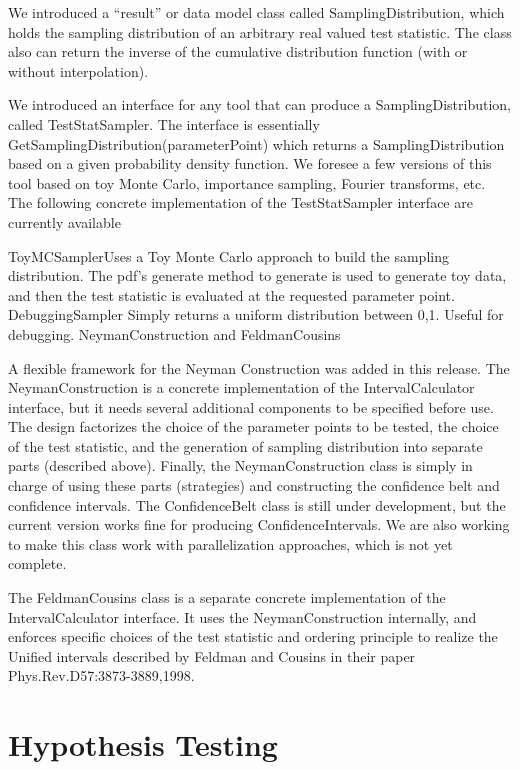 \documentclass[11pt]{article}
\begin{document}
We introduced a ``result'' or data model class called SamplingDistribution, which holds the sampling distribution of an arbitrary real valued test statistic.  The class also can return the inverse of the cumulative distribution function (with or without interpolation).  

We introduced an interface for any tool that can produce a SamplingDistribution, called TestStatSampler.  The interface is essentially GetSamplingDistribution(parameterPoint) which returns a SamplingDistribution based on a given probability density function.  We foresee a few versions of this tool based on toy Monte Carlo, importance sampling, Fourier transforms, etc.  The following concrete implementation of the TestStatSampler interface are currently available

ToyMCSamplerUses a Toy Monte Carlo approach to build the sampling distribution.  The pdf's generate method to generate is used to generate toy data, and then the test statistic is evaluated at the requested parameter point.
DebuggingSampler Simply returns a uniform distribution between 0,1.  Useful for debugging.
NeymanConstruction and FeldmanCousins

A flexible framework for the Neyman Construction was added in this release. The NeymanConstruction is a concrete implementation of the IntervalCalculator interface, but it needs several additional components to be specified before use. The design factorizes the choice of the parameter points to be tested, the choice of the test statistic, and the generation of sampling distribution into separate parts (described above).  Finally, the NeymanConstruction class is simply in charge of using these parts (strategies) and constructing the confidence belt and confidence intervals.  The ConfidenceBelt class is still under development, but the current version works fine for producing ConfidenceIntervals.  We are also working to make this class work with parallelization approaches, which is not yet complete.

The FeldmanCousins class is a separate concrete implementation of the IntervalCalculator interface.  It uses the NeymanConstruction internally, and enforces specific choices of the test statistic and ordering principle to realize the Unified intervals described by Feldman and Cousins in their paper Phys.Rev.D57:3873-3889,1998.

\section{Hypothesis Testing}
\end{document}
